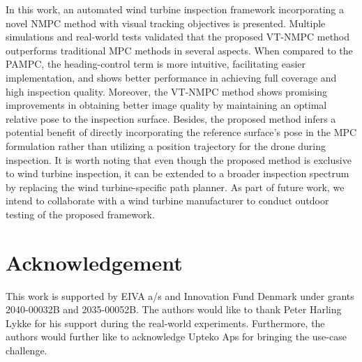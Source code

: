 In this work, an automated wind turbine inspection framework incorporating a novel NMPC method with visual tracking objectives is presented. Multiple simulations and real-world tests validated that the proposed VT-NMPC method outperforms traditional MPC methods in several aspects. When compared to the PAMPC, the heading-control term is more intuitive, facilitating easier implementation, and shows better performance in achieving full coverage and high inspection quality. Moreover, the VT-NMPC method shows promising improvements in obtaining better image quality by maintaining an optimal relative pose to the inspection surface. Besides, the proposed method infers a potential benefit of directly incorporating the reference surface's pose in the MPC formulation rather than utilizing a position trajectory for the drone during inspection. It is worth noting that even though the proposed method is exclusive to wind turbine inspection, it can be extended to a broader inspection spectrum by replacing the wind turbine-specific path planner.
As part of future work, we intend to collaborate with a wind turbine manufacturer to conduct outdoor testing of the proposed framework.


\section{Acknowledgement}
{
This work is supported by EIVA a/s and Innovation Fund Denmark under grants 2040-00032B and 2035-00052B. The authors would like to thank Peter Harling Lykke for his support during the real-world experiments. Furthermore, the authors would further like to acknowledge Upteko Aps for bringing the use-case challenge.
}


















